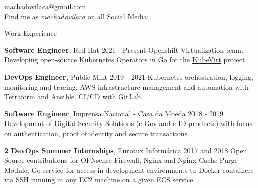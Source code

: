 \documentclass{resume}
\begin{document}
\begin{center}
    \href{mailto:machadovilaca@gmail.com}{machadovilaca@gmail.com} \hspace{0.1cm}
    \\
    Find me as \textit{machadovilaca} on all Social Media:
    \href{https://www.linkedin.com/in/machadovilaca}{\faLinkedin} \hspace{0.1cm}
    \href{https://github.com/machadovilaca}{\faGithub} \hspace{0.1cm}
    \href{https://gitlab.com/machadovilaca}{\faGitlab} \hspace{0.1cm}
\end{center}


\begin{rSection}{Work Experience}

\begin{rSubsection}
{\textbf{Software Engineer}, Red Hat \href{https://www.redhat.com}{\faLink}}{2021 - Present}{}{}
Openshift Virtualization team. Developing open-source Kubernetes Operators in Go for the \href{https://kubevirt.io/}{KubeVirt} project
\end{rSubsection}

\begin{rSubsection}
{\textbf{DevOps Engineer}, Public Mint \href{https://publicmint.com/}{\faLink}}{2019 - 2021}{}{}
Kubernetes orchestration, logging, monitoring and tracing. AWS infrastructure management and automation with Terraform and Ansible. CI/CD with GitLab
\end{rSubsection}

\begin{rSubsection}
{\textbf{Software Engineer}, Imprensa Nacional - Casa da Moeda \href{https://www.incm.pt}{\faLink}}{2018 - 2019}{}{}
Development of Digital Security Solutions (e-Gov and e-ID products) with focus on authentication, proof of identity and secure transactions
\end{rSubsection}

\begin{rSubsection}
{\textbf{2 DevOps Summer Internships}, Eurotux Informática \href{https://eurotux.com/}{\faLink}}{2017 and 2018}{}{}
Open Source contributions for OPNsense Firewall, Nginx and Nginx Cache Purge Module. Go service for access in development environments to Docker containers via SSH running in any EC2 machine on a given ECS service
\end{rSubsection}

\end{rSection}
\end{document}
